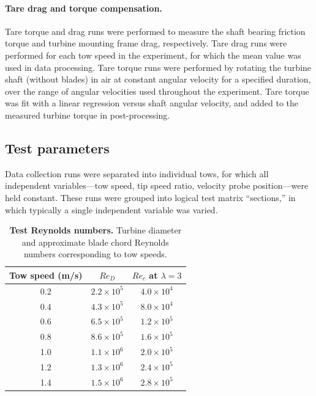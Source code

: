 \documentclass[10pt,letterpaper]{article}
\begin{document}
\paragraph{Tare drag and torque compensation.} Tare torque and drag runs were
performed to measure the shaft bearing friction torque and turbine mounting
frame drag, respectively. Tare drag runs were performed for each tow speed in
the experiment, for which the mean value was used in data processing. Tare
torque runs were performed by rotating the turbine shaft (without blades) in air
at constant angular velocity for a specified duration, over the range of angular
velocities used throughout the experiment. Tare torque was fit with a linear
regression versus shaft angular velocity, and added to the measured turbine
torque in post-processing.


\subsection*{Test parameters}

Data collection runs were separated into individual tows, for which all
independent variables---tow speed, tip speed ratio, velocity probe
position---were held constant. These runs were grouped into logical test matrix
``sections,'' in which typically a single independent variable was varied.



\begin{table}[ht]
\centering
\begin{tabular}{c|c|c}
Tow speed (m/s) & $Re_D$ & $Re_c$ at $\lambda = 3$ \\ 
\hline 
0.2 & $2.2 \times 10^5$ & $4.0 \times 10^4$ \\ 
0.4 & $4.3 \times 10^5$ & $8.0 \times 10^4$ \\ 
0.6 & $6.5 \times 10^5$ & $1.2 \times 10^5$ \\ 
0.8 & $8.6 \times 10^5$ & $1.6 \times 10^5$ \\ 
1.0 & $1.1 \times 10^6$ & $2.0 \times 10^5$ \\ 
1.2 & $1.3 \times 10^6$ & $2.4 \times 10^5$ \\ 
1.4 & $1.5 \times 10^6$ & $2.8 \times 10^5$ \\
\end{tabular} 
\caption{{\bf Test Reynolds numbers.} Turbine diameter and approximate blade 
chord Reynolds numbers corresponding to tow speeds.} \label{tab:re}
\end{table}
\end{document}

